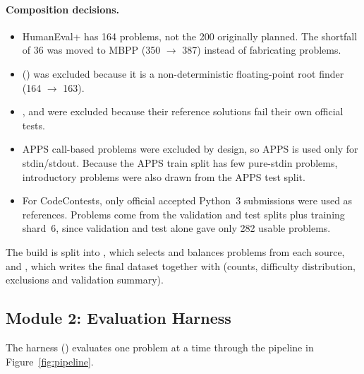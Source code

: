 \paragraph{Composition decisions.}
\begin{itemize}[leftmargin=*]
  \item HumanEval+ has 164 problems, not the 200 originally planned. The shortfall of 36 was moved to MBPP (350 $\rightarrow$ 387) instead of fabricating problems.
  \item {} () was excluded because it is a non-deterministic floating-point root finder (164 $\rightarrow$ 163).
  \item {},  and  were excluded because their reference solutions fail their own official tests.
  \item APPS call-based problems were excluded by design, so APPS is used only for stdin/stdout. Because the APPS train split has few pure-stdin problems, introductory problems were also drawn from the APPS test split.
  \item For CodeContests, only official accepted Python~3 submissions were used as references. Problems come from the validation and test splits plus training shard~6, since validation and test alone gave only 282 usable problems.
\end{itemize}
The build is split into , which selects and balances problems from each source, and , which writes the final dataset together with  (counts, difficulty distribution, exclusions and validation summary).

\subsection{Module 2: Evaluation Harness}

The harness () evaluates one problem at a time through the pipeline in Figure~\ref{fig:pipeline}.

